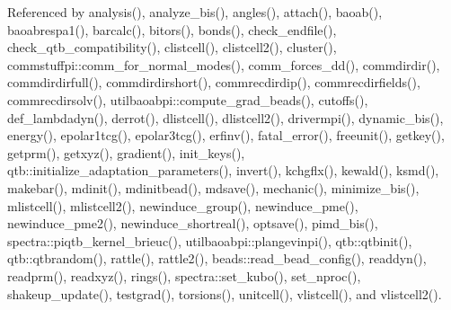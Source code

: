 Referenced by analysis(), analyze\-\_\-bis(), angles(), attach(), baoab(), baoabrespa1(), barcalc(), bitors(), bonds(), check\-\_\-endfile(), check\-\_\-qtb\-\_\-compatibility(), clistcell(), clistcell2(), cluster(), commstuffpi\-::comm\-\_\-for\-\_\-normal\-\_\-modes(), comm\-\_\-forces\-\_\-dd(), commdirdir(), commdirdirfull(), commdirdirshort(), commrecdirdip(), commrecdirfields(), commrecdirsolv(), utilbaoabpi\-::compute\-\_\-grad\-\_\-beads(), cutoffs(), def\-\_\-lambdadyn(), derrot(), dlistcell(), dlistcell2(), drivermpi(), dynamic\-\_\-bis(), energy(), epolar1tcg(), epolar3tcg(), erfinv(), fatal\-\_\-error(), freeunit(), getkey(), getprm(), getxyz(), gradient(), init\-\_\-keys(), qtb\-::initialize\-\_\-adaptation\-\_\-parameters(), invert(), kchgflx(), kewald(), ksmd(), makebar(), mdinit(), mdinitbead(), mdsave(), mechanic(), minimize\-\_\-bis(), mlistcell(), mlistcell2(), newinduce\-\_\-group(), newinduce\-\_\-pme(), newinduce\-\_\-pme2(), newinduce\-\_\-shortreal(), optsave(), pimd\-\_\-bis(), spectra\-::piqtb\-\_\-kernel\-\_\-brieuc(), utilbaoabpi\-::plangevinpi(), qtb\-::qtbinit(), qtb\-::qtbrandom(), rattle(), rattle2(), beads\-::read\-\_\-bead\-\_\-config(), readdyn(), readprm(), readxyz(), rings(), spectra\-::set\-\_\-kubo(), set\-\_\-nproc(), shakeup\-\_\-update(), testgrad(), torsions(), unitcell(), vlistcell(), and vlistcell2().

